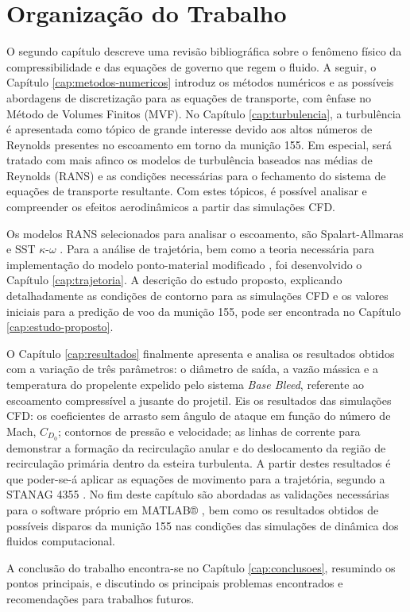 \section{Organização do Trabalho}

O segundo capítulo descreve uma revisão bibliográfica sobre o fenômeno físico da compressibilidade e das equações de governo que regem o fluido. A seguir, o Capítulo \ref{cap:metodos-numericos} introduz os métodos numéricos e as possíveis abordagens de discretização para as equações de transporte, com ênfase no Método de Volumes Finitos (MVF). No Capítulo \ref{cap:turbulencia}, a turbulência é apresentada como tópico de grande interesse devido aos altos números de Reynolds presentes no escoamento em torno da munição \qty{155}{\millimetre}. Em especial, será tratado com mais afinco os modelos de turbulência baseados nas médias de Reynolds (RANS) e as condições necessárias para o fechamento do sistema de equações de transporte resultante. Com estes tópicos, é possível analisar e compreender os efeitos aerodinâmicos a partir das simulações CFD.

Os modelos RANS selecionados para analisar o escoamento, são Spalart-Allmaras \cite{Spalart1992} e SST $\kappa$-$\omega$ \cite{Menter1994TwoequationET,Menter2003,Menter2009}. Para a análise de trajetória, bem como a teoria necessária para implementação do modelo ponto-material modificado \cite{stanag4355}, foi desenvolvido o Capítulo \ref{cap:trajetoria}. A descrição do estudo proposto, explicando detalhadamente as condições de contorno para as simulações CFD e os valores iniciais para a predição de voo da munição \qty{155}{\millimetre}, pode ser encontrada no Capítulo \ref{cap:estudo-proposto}.

O Capítulo \ref{cap:resultados} finalmente apresenta e analisa os resultados obtidos com a variação de três parâmetros: o diâmetro de saída, a vazão mássica e a temperatura do propelente expelido pelo sistema \textit{Base Bleed}, referente ao escoamento compressível a jusante do projetil. Eis os resultados das simulações CFD: os coeficientes de arrasto sem ângulo de ataque em função do número de Mach, \(C_{D_{0}}\); contornos de pressão e velocidade; as linhas de corrente para demonstrar a formação da recirculação anular e do deslocamento da região de recirculação primária dentro da esteira turbulenta. A partir destes resultados é que poder-se-á aplicar as equações de movimento para a trajetória, segundo a STANAG 4355 \cite{stanag4355}. No fim deste capítulo são abordadas as validações necessárias para o software próprio em MATLAB® \cite{ThallyoENCIT2022,Thallyo2022}, bem como os resultados obtidos de possíveis disparos da munição \qty{155}{\millimetre} nas condições das simulações de dinâmica dos fluidos computacional. 

A conclusão do trabalho encontra-se no Capítulo \ref{cap:conclusoes}, resumindo os pontos principais, e discutindo os principais problemas encontrados e recomendações para trabalhos futuros.